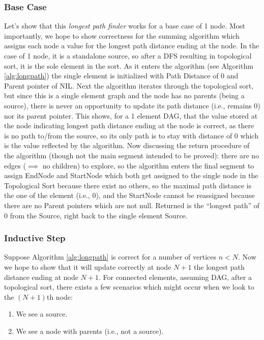 \documentclass[conference]{styles/acmsiggraph}
\newcommand{\?}{\stackrel{?}{=}}
\begin{document}
\subsubsection{Base Case}
Let's show that this \textit{longest path finder} works for a base case of 1 node.  Most importantly, we hope to show correctness for the summing algorithm which assigns each node a value for the longest path distance ending at the node.  In the case of 1 node, it is a standalone source, so after a DFS resulting in topological sort, it is the sole element in the sort.  As it enters the algorithm (see Algorithm \ref{alg:longpath}) the single element is initialized with Path Distance of 0 and Parent pointer of NIL.  Next the algorithm iterates through the topological sort, but since this is a single element graph and the node has no parents (being a source), there is never an opportunity to update its path distance (i.e., remains 0) nor its parent pointer.  This shows, for a 1 element DAG, that the value stored at the node indicating longest path distance ending at the node is correct, as there is no path to/from the source, so its only path is to stay with distance of 0 which is the value reflected by the algorithm.  Now discussing the return procedure of the algorithm (though not the main segment intended to be proved): there are no edges ($\implies$ no children) to explore, so the algorithm enters the final segment to assign EndNode and StartNode which both get assigned to the single node in the Topological Sort because there exist no others, so the maximal path distance is the one of the element (i.e., 0), and the StartNode cannot be reassigned because there are no Parent pointers which are not null.  Returned is the \enquote{longest path} of 0 from the Source, right back to the single element Source.

\subsubsection{Inductive Step}

Suppose Algorithm \ref{alg:longpath} is correct for a number of vertices $n < N$.  Now we hope to show that it will update correctly at node $N+1$ the longest path distance ending at node $N+1$.  For connected elements, assuming DAG, after a topological sort, there exists a few scenarios which might occur when we look to the $(N+1)$th node:
\begin{enumerate}
    \item We see a source.
    \item We see a node with parents (i.e., not a source).
\end{enumerate}
\end{document}
